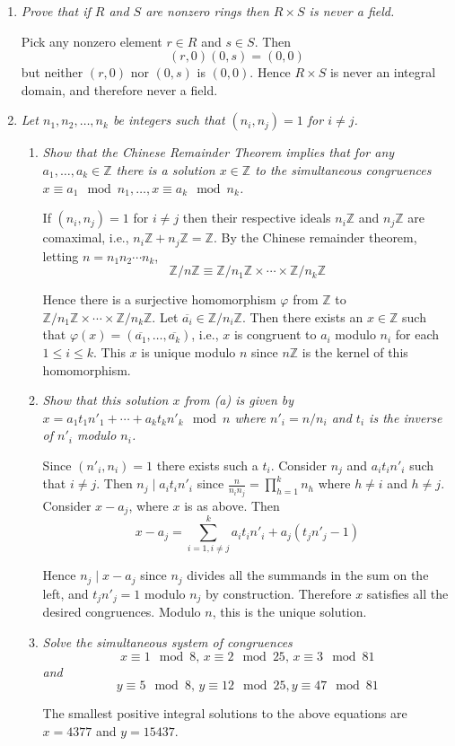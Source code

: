 \documentclass[letterpaper, 11pt]{article}
\newcommand{\Z}{\mathbb{Z}}
\begin{document}
\begin{enumerate}
\item \emph{Prove that if $R$ and $S$ are nonzero rings then $R \times S$ is never a field.}

Pick any nonzero element $r \in R$ and $s \in S$.  Then $$(r,0)(0,s) = (0,0)$$ but neither $(r,0)$ nor $(0,s)$ is $(0,0)$.  Hence $R \times S$ is never an integral domain, and therefore never a field.

\item \emph{Let $n_1, n_2, \ldots, n_k$ be integers such that $(n_i,n_j) = 1$ for $i \neq j$.}
\begin{enumerate}
\item \emph{Show that the Chinese Remainder Theorem implies that for any $a_1, \ldots, a_k \in \Z$ there is a solution $x \in \Z$ to the simultaneous congruences $x \equiv a_1 \mod n_1, \ldots, x \equiv a_k \mod n_k$.}

If $(n_i, n_j) = 1$ for $i \neq j$ then their respective ideals $n_i\Z$ and $n_j\Z$ are comaximal, i.e., $n_i\Z + n_j\Z = \Z$.  By the Chinese remainder theorem, letting $n = n_1n_2 \cdots n_k$,
\[
\Z/n\Z \equiv \Z/n_1\Z \times \cdots \times \Z/n_k\Z
\]

Hence there is a surjective homomorphism $\varphi$ from $\Z$ to $\Z/n_1\Z \times \cdots \times \Z/n_k\Z$.  Let $\overline{a_i} \in \Z / n_i \Z$.  Then there exists an $x \in \Z$ such that $\varphi(x) = (\overline{a_1}, \ldots, \overline{a_k})$, i.e., $x$ is congruent to $a_i$ modulo $n_i$ for each $1 \leq i \leq k$.  This $x$ is unique modulo $n$ since $n\Z$ is the kernel of this homomorphism.

\item \emph{Show that this solution $x$ from (a) is given by $x = a_1t_1n'_1 + \cdots + a_kt_kn'_k \mod n$ where $n'_i = n/n_i$ and $t_i$ is the inverse of $n'_i$ modulo $n_i$.}

Since $(n'_i, n_i) = 1$ there exists such a $t_i$.  Consider $n_j$ and $a_it_in'_i$ such that $i \neq j$.  Then $n_j \mid a_it_in'_i$ since $\frac{n}{n_in_j} = \prod_{h = 1}^k n_h$ where $h \neq i$ and $h \neq j$.  Consider $x - a_j$, where $x$ is as above.  Then
\[
x - a_j = \sum_{i=1, i \neq j}^k a_i t_i n'_i + a_j(t_jn'_j - 1)
\]

Hence $n_j \mid x - a_j$ since $n_j$ divides all the summands in the sum on the left, and $t_jn'_j = 1$ modulo $n_j$ by construction.  Therefore $x$ satisfies all the desired congruences.  Modulo $n$, this is the unique solution.

\item \emph{Solve the simultaneous system of congruences $$x \equiv 1 \mod 8,\, x \equiv 2 \mod 25,\, x \equiv 3 \mod 81$$ and $$y \equiv 5 \mod 8,\, y \equiv 12 \mod 25, y \equiv 47  \mod 81$$}

The smallest positive integral solutions to the above equations are $x = 4377$ and $y = 15437$.
 
\end{enumerate}

\end{enumerate}
\end{document}
